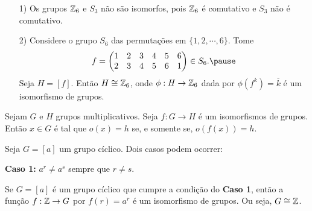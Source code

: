 \documentclass{beamer}
\begin{document}
    \begin{frame}
        \begin{exemplos}
            \vspace{.3cm}
            \begin{enumerate}
                \item[1)] Os grupos $\mathbb{Z}_6$ e $S_3$ \pause não são isomorfos, \pause pois $\mathbb{Z}_6$ é comutativo \pause e $S_3$ não é comutativo.\pause

                \vspace{.3cm}

                \item[2)] Considere o grupo $S_6$ das permutações em $\{1, 2, \cdots, 6\}$. \pause Tome
                \[
                    f = \begin{pmatrix}
                        1 & 2 & 3 & 4 & 5 & 6\\
                        2 & 3 & 4 & 5 & 6 & 1
                    \end{pmatrix} \in S_6. \pause
                \]
                Seja $H = [f]$. \pause Então $H \cong \mathbb{Z}_6$, \pause onde $\phi : H \to \mathbb{Z}_6$ dada por $\phi(f^k) = \overline{k}$ \pause é um isomorfismo de grupos.

                \vspace{.3cm}

            \end{enumerate}
        \end{exemplos}
    \end{frame}

    \begin{frame}
        \begin{proposicao}
            Sejam $G$ e $H$ grupos multiplicativos. \pause Seja $f : G \to H$ é um isomorfismos de grupos. \pause Então $x \in G$ \pause é tal que $o(x) = h$ \pause se, e somente se, $o(f(x)) = h$.
        \end{proposicao}
    \end{frame}

    \begin{frame}
        Seja $G = [a]$ um grupo cíclico. \pause Dois casos podem ocorrer: \pause

        \textbf{Caso 1:} $a^r \ne a^s$ \pause sempre que $r \ne s$.
    \end{frame}

    \begin{frame}
        \begin{proposicao}
            Se $G = [a]$ é um grupo cíclico que cumpre a condição do \textbf{Caso 1}, \pause então a função $f : \mathbb{Z} \to G$ por $f(r) = a^r$ \pause é um isomorfismo de grupos. \pause Ou seja, $G \cong \mathbb{Z}$.
        \end{proposicao}
    \end{frame}
\end{document}
